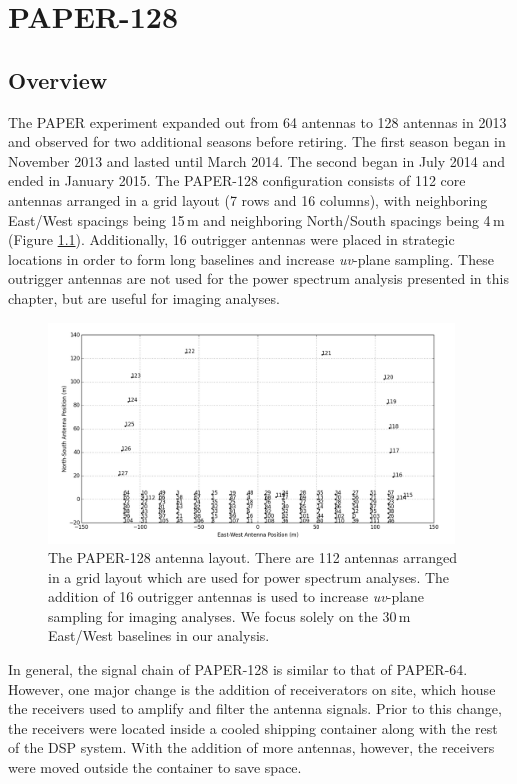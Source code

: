 \chapter{PAPER-128}
\label{c.PSA128}

\section{Overview}

The PAPER experiment expanded out from 64 antennas to 128 antennas in 2013 and observed for two additional seasons before retiring. The first season began in November 2013 and lasted until March 2014. The second began in July 2014 and ended in January 2015. The PAPER-128 configuration consists of 112 core antennas arranged in a grid layout (7 rows and 16 columns), with neighboring East/West spacings being 15\,m and neighboring North/South spacings being 4\,m (Figure \ref{fig:paper128_array}). Additionally, 16 outrigger antennas were placed in strategic locations in order to form long baselines and increase \textit{uv}-plane sampling. These outrigger antennas are not used for the power spectrum analysis presented in this chapter, but are useful for imaging analyses.

\begin{figure}
	\centering
	\includegraphics[width=0.96\textwidth]{plots/paper128_layout.png}
	\caption{The PAPER-128 antenna layout. There are 112 antennas arranged in a grid layout which are used for power spectrum analyses. The addition of 16 outrigger antennas is used to increase \textit{uv}-plane sampling for imaging analyses. We focus solely on the 30\,m East/West baselines in our analysis.}
	\label{fig:paper128_array}
\end{figure}

In general, the signal chain of PAPER-128 is similar to that of PAPER-64. However, one major change is the addition of receiverators on site, which house the receivers used to amplify and filter the antenna signals. Prior to this change, the receivers were located inside a cooled shipping container along with the rest of the DSP system. With the addition of more antennas, however, the receivers were moved outside the container to save space. 

